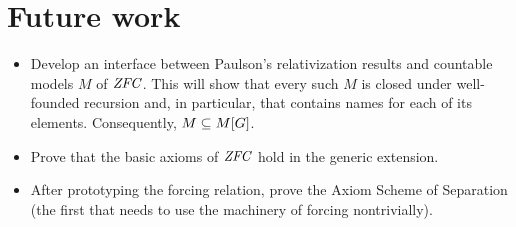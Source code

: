 \documentclass[9pt]{entcs} \usepackage{entcsmacro}
\begin{document}
 

\section{Future work}
\begin{itemize}
\item Develop an interface between Paulson's relativization results
  and countable models $M$ of $\mathit{ZFC}$. This will show
  that every such $M$ is closed under well-founded recursion and, in
  particular, that contains names for each of its
  elements. Consequently, $M\subseteq M[G]$.
\item Prove that the basic axioms of $\mathit{ZFC}$ hold in the generic
  extension. 
\item After prototyping the forcing relation, prove the Axiom Scheme
  of Separation (the first that needs to use the machinery of forcing
  nontrivially).
\end{itemize}


\end{document}
